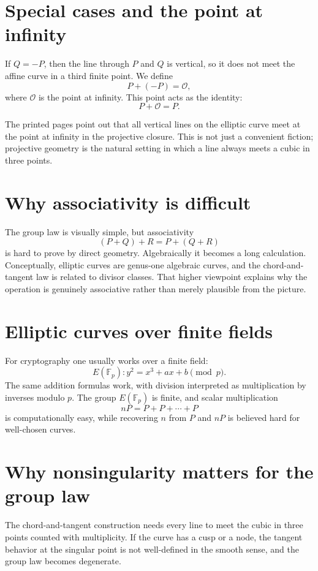 \section{Special cases and the point at infinity}

If \(Q=-P\), then the line through \(P\) and \(Q\) is vertical, so it does not meet the affine curve in a third finite point.  We define
\[
  P+(-P)=\mathcal O,
\]
where \(\mathcal O\) is the point at infinity.  This point acts as the identity:
\[
  P+\mathcal O=P.
\]

The printed pages point out that all vertical lines on the elliptic curve meet at the point at infinity in the projective closure.  This is not just a convenient fiction; projective geometry is the natural setting in which a line always meets a cubic in three points.

\section{Why associativity is difficult}

The group law is visually simple, but associativity
\[
  (P+Q)+R=P+(Q+R)
\]
is hard to prove by direct geometry.  Algebraically it becomes a long calculation.  Conceptually, elliptic curves are genus-one algebraic curves, and the chord-and-tangent law is related to divisor classes.  That higher viewpoint explains why the operation is genuinely associative rather than merely plausible from the picture.

\section{Elliptic curves over finite fields}

For cryptography one usually works over a finite field:
\[
  E(\mathbb F_p):y^2=x^3+ax+b\pmod p.
\]
The same addition formulas work, with division interpreted as multiplication by inverses modulo \(p\).  The group \(E(\mathbb F_p)\) is finite, and scalar multiplication
\[
  nP=P+P+\cdots+P
\]
is computationally easy, while recovering \(n\) from \(P\) and \(nP\) is believed hard for well-chosen curves.


\section{Why nonsingularity matters for the group law}

The chord-and-tangent construction needs every line to meet the cubic in three points counted with multiplicity.  If the curve has a cusp or a node, the tangent behavior at the singular point is not well-defined in the smooth sense, and the group law becomes degenerate.

